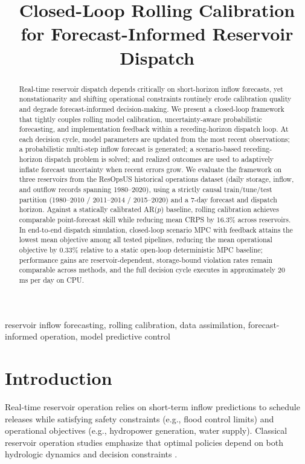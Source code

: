 \documentclass[conference]{IEEEtran}
\begin{document}
\title{Closed-Loop Rolling Calibration for Forecast-Informed Reservoir Dispatch}

\author{%
}

\maketitle

\begin{IEEEkeywords}
reservoir inflow forecasting, rolling calibration, data assimilation, forecast-informed operation, model predictive control
\end{IEEEkeywords}

\begin{abstract}
Real-time reservoir dispatch depends critically on short-horizon inflow forecasts, yet nonstationarity and shifting operational constraints routinely erode calibration quality and degrade forecast-informed decision-making. We present a closed-loop framework that tightly couples rolling model calibration, uncertainty-aware probabilistic forecasting, and implementation feedback within a receding-horizon dispatch loop. At each decision cycle, model parameters are updated from the most recent observations; a probabilistic multi-step inflow forecast is generated; a scenario-based receding-horizon dispatch problem is solved; and realized outcomes are used to adaptively inflate forecast uncertainty when recent errors grow. We evaluate the framework on three reservoirs from the ResOpsUS historical operations dataset (daily storage, inflow, and outflow records spanning 1980--2020), using a strictly causal train/tune/test partition (1980--2010 / 2011--2014 / 2015--2020) and a 7-day forecast and dispatch horizon. Against a statically calibrated AR($p$) baseline, rolling calibration achieves comparable point-forecast skill while reducing mean CRPS by 16.3\% across reservoirs. In end-to-end dispatch simulation, closed-loop scenario MPC with feedback attains the lowest mean objective among all tested pipelines, reducing the mean operational objective by 0.33\% relative to a static open-loop deterministic MPC baseline; performance gains are reservoir-dependent, storage-bound violation rates remain comparable across methods, and the full decision cycle executes in approximately 20\,ms per day on CPU.
\end{abstract}

\section{Introduction}
Real-time reservoir operation relies on short-term inflow predictions to schedule releases
while satisfying safety constraints (e.g., flood control limits) and operational objectives
(e.g., hydropower generation, water supply). Classical reservoir operation studies emphasize
that optimal policies depend on both hydrologic dynamics and decision constraints
\cite{yeh1985reservoir,labadie2004optimal}.
\end{document}
